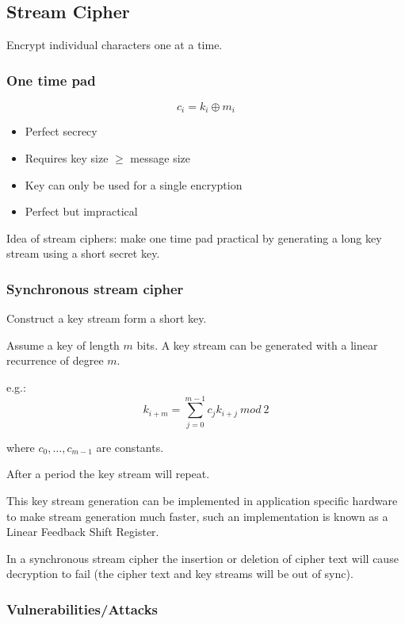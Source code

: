\documentclass[a4paper]{article}
\begin{document}
\subsection{Stream Cipher}

Encrypt individual characters one at a time.

\subsubsection{One time pad}
\label{sec:one_time_pad}

\[
  c_{i} = k_{i} \oplus m_{i}
\]

\begin{itemize}
  \item Perfect secrecy
  \item Requires key size $\geq$ message size
  \item Key can only be used for a single encryption
  \item Perfect but impractical
\end{itemize}

Idea of stream ciphers: make one time pad practical by generating a long key
stream using a short secret key.

\subsubsection{Synchronous stream cipher}

Construct a key stream form a short key.

Assume a key of length $m$ bits. A key stream can be generated with a linear
recurrence of degree $m$.

e.g.:
\[
  k_{i+m} = \sum^{m-1}_{j=0} c_{j}k_{i+j} \: mod \: 2
\]

where $c_{0}, \ldots, c_{m-1}$ are constants.

After a period the key stream will repeat.

This key stream generation can be implemented in application specific hardware
to make stream generation much faster, such an implementation is known as a
Linear Feedback Shift Register.

In a synchronous stream cipher the insertion or deletion of cipher text will
cause decryption to fail (the cipher text and key streams will be out of sync).

\subsubsection{Vulnerabilities/Attacks}
\end{document}
